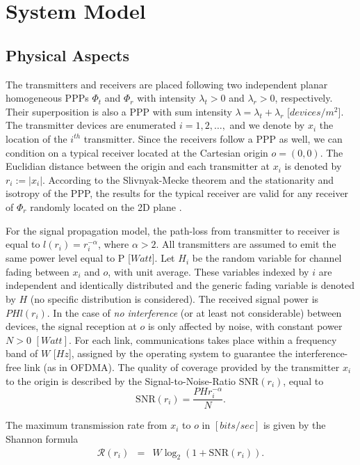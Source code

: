 \documentclass[conference]{IEEEtran}
\begin{document}
\section{System Model}
\label{secII}

\subsection{Physical Aspects}

The transmitters and receivers are placed following two independent planar homogeneous PPPs $\Phi_t$ and $\Phi_r$ with intensity $\lambda_t>0$ and $\lambda_r>0$, respectively. Their superposition is also a PPP with sum intensity $\lambda=\lambda_t+\lambda_r$ [$devices/m^2$]. The transmitter devices are enumerated $i=1,2,\ldots,$ and we denote by \textit{$x_i$} the location of the \textit{$i^{th}$} transmitter. Since the receivers follow a PPP as well, we can condition on a typical receiver located at the Cartesian origin $o=(0,0)$. The Euclidian distance between the origin and each transmitter at $x_i$ is denoted by $r_i:=|x_i|$. According to the Slivnyak-Mecke theorem and the stationarity and isotropy of the PPP, the results for the typical receiver are valid for any receiver of $\Phi_r$ randomly located on the 2D plane \cite{BacBlaVol1}.


For the signal propagation model, the path-loss from transmitter to receiver is equal to $l(r_i)=r_{i}^{-\alpha}$, where $\alpha>2$. All transmitters are assumed to emit the same power level equal to P [$Watt$]. Let $H_i$ be the random variable for channel fading between $x_i$ and $o$, with unit average. These variables indexed by $i$ are independent and identically distributed and the generic fading variable is denoted by $H$ (no specific distribution is considered). The received signal power is $P H l(r_i)$. In the case of \textit{no interference} (or at least not considerable) between devices, the signal reception at $o$ is only affected by noise, with constant power $N>0$ $[Watt]$. For each link, communications takes place within a frequency band of $W$ [$Hz$], assigned by the operating system to guarantee the interference-free link (as in OFDMA). The quality of coverage provided by the transmitter $x_i$ to the origin is described by the Signal-to-Noise-Ratio $\mathrm{SNR}(r_i)$, equal to
\begin{equation}
\label{snr}
\mathrm{SNR}(r_i)=\frac{PHr_{i}^{-\alpha}} {N}.
\end{equation}

The maximum transmission rate from $x_i$ to $o$ in $[bits/sec]$ is given by the Shannon formula
\begin{eqnarray}
\label{rate}
\mathcal{R}(r_i) & = & W\log_2\left(1+\mathrm{SNR}(r_i)\right).
\end{eqnarray}
\end{document}
